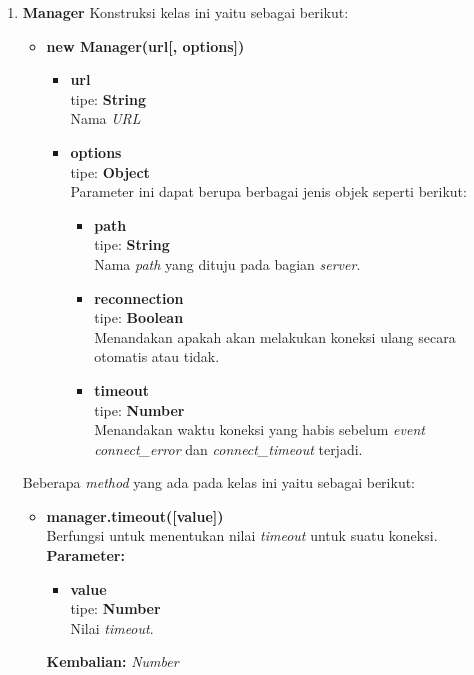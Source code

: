 \documentclass[a4paper,twoside]{article}
\begin{document}
\begin{enumerate}
\begin{enumerate}
\begin{enumerate}
			\item \textbf{Manager}
			Konstruksi kelas ini yaitu sebagai berikut:
			\begin{itemize}
				\item \textbf{new Manager(url[, options])} \\
				\begin{itemize}
					\item \textbf{url} \\tipe: \textbf{String} \\ Nama \textit{URL}
					\item \textbf{options} \\tipe: \textbf{Object} \\ Parameter ini dapat berupa berbagai jenis objek seperti berikut:
					\begin{itemize}
						\item \textbf{path} \\tipe: \textbf{String} \\ Nama \textit{path} yang dituju pada bagian \textit{server}.
						\item \textbf{reconnection} \\tipe: \textbf{Boolean} \\ Menandakan apakah akan melakukan koneksi ulang secara otomatis atau tidak.
						\item \textbf{timeout} \\tipe: \textbf{Number} \\ Menandakan waktu koneksi yang habis sebelum \textit{event connect\_error} dan \textit{connect\_timeout} terjadi.
					\end{itemize}
				\end{itemize}
			\end{itemize}
			
			Beberapa \textit{method} yang ada pada kelas ini yaitu sebagai berikut:
			\begin{itemize}
				\item \textbf{manager.timeout([value])} \\
				Berfungsi untuk menentukan nilai \textit{timeout} untuk suatu koneksi.\\
				\textbf{Parameter:}
				\begin{itemize}
					\item \textbf{value} \\tipe: \textbf{Number} \\ Nilai \textit{timeout}.
				\end{itemize}
				\textbf{Kembalian:} \textit{Number}
				

\end{itemize}
\end{enumerate}
\end{enumerate}
\end{enumerate}
\end{document}
